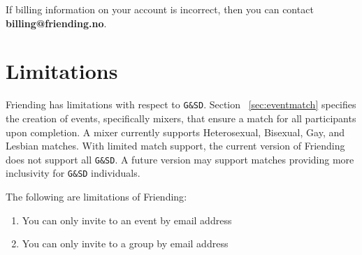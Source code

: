 \documentclass[a4paper,11pt,titlepage]{scrartcl}
\newcommand{\textapp}[1]{{\fontfamily{cmss}\selectfont#1}}
\newcommand{\Friending}{\textapp{Friending}}
\newcommand{\abbrevation}[1]{\texttt{#1}}
\begin{document}
If billing information on your account is incorrect, then you can contact \textbf{{billing@friending.no}}.

\clearpage
\section{Limitations}
\label{sec:limitations}

\Friending{} has limitations with respect to \abbrevation{G\&SD}.  Section ~\ref{sec:eventmatch} specifies the creation of events, specifically mixers, that ensure a match for all participants upon completion.  A mixer currently supports Heterosexual, Bisexual, Gay, and Lesbian matches.  With limited match support, the current version of \Friending{} does not support all \abbrevation{G\&SD}.  A future version may support matches providing more inclusivity for \abbrevation{G\&SD} individuals.

The following are limitations of \Friending{}:
\begin{enumerate}
\item You can only invite to an event by email address
\item You can only invite to a group by email address
\end{enumerate}
\end{document}
